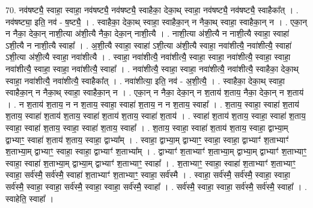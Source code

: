 \documentclass[17pt]{extarticle}
\begin{document}
70. नव॑षष्ट्यै॒ स्वाहा॒ स्वाहा॒ नव॑षष्ट्यै॒ नव॑षष्ट्यै॒ स्वाहैका॒ देका॒थ् स्वाहा॒ नव॑षष्ट्यै॒ नव॑षष्ट्यै॒ स्वाहैका᳚त् । . नव॑षष्ट्या॒ इति॒ नव॑ - ष॒ष्ट्यै॒ । . स्वाहैका॒ देका॒थ् स्वाहा॒ स्वाहैका॒न् न नैका॒थ् स्वाहा॒ स्वाहैका॒न् न । . एका॒न् न नैका॒ देका॒न् नाशी॒त्या अ॑शी॒त्यै नैका॒ देका॒न् नाशी॒त्यै । . नाशी॒त्या अ॑शी॒त्यै न नाशी॒त्यै स्वाहा॒ स्वाहा॑ ऽशी॒त्यै न नाशी॒त्यै स्वाहा᳚ । . अ॒शी॒त्यै स्वाहा॒ स्वाहा॑ ऽशी॒त्या अ॑शी॒त्यै स्वाहा॒ नवा॑शीत्यै॒ नवा॑शीत्यै॒ स्वाहा॑ ऽशी॒त्या अ॑शी॒त्यै स्वाहा॒ नवा॑शीत्यै । . स्वाहा॒ नवा॑शीत्यै॒ नवा॑शीत्यै॒ स्वाहा॒ स्वाहा॒ नवा॑शीत्यै॒ स्वाहा॒ स्वाहा॒ नवा॑शीत्यै॒ स्वाहा॒ स्वाहा॒ नवा॑शीत्यै॒ स्वाहा᳚ । . नवा॑शीत्यै॒ स्वाहा॒ स्वाहा॒ नवा॑शीत्यै॒ नवा॑शीत्यै॒ स्वाहैका॒ देका॒थ् स्वाहा॒ नवा॑शीत्यै॒ नवा॑शीत्यै॒ स्वाहैका᳚त् । . नवा॑शीत्या॒ इति॒ नव॑ - अ॒शी॒त्यै॒ । . स्वाहैका॒ देका॒थ् स्वाहा॒ स्वाहैका॒न् न नैका॒थ् स्वाहा॒ स्वाहैका॒न् न । . एका॒न् न नैका॒ देका॒न् न श॒ताय॑ श॒ताय॒ नैका॒ देका॒न् न श॒ताय॑ । . न श॒ताय॑ श॒ताय॒ न न श॒ताय॒ स्वाहा॒ स्वाहा॑ श॒ताय॒ न न श॒ताय॒ स्वाहा᳚ । . श॒ताय॒ स्वाहा॒ स्वाहा॑ श॒ताय॑ श॒ताय॒ स्वाहा॑ श॒ताय॑ श॒ताय॒ स्वाहा॑ श॒ताय॑ श॒ताय॒ स्वाहा॑ श॒ताय॑ । . स्वाहा॑ श॒ताय॑ श॒ताय॒ स्वाहा॒ स्वाहा॑ श॒ताय॒ स्वाहा॒ स्वाहा॑ श॒ताय॒ स्वाहा॒ स्वाहा॑ श॒ताय॒ स्वाहा᳚ । . श॒ताय॒ स्वाहा॒ स्वाहा॑ श॒ताय॑ श॒ताय॒ स्वाहा॒ द्वाभ्या॒म् द्वाभ्याꣳ॒॒ स्वाहा॑ श॒ताय॑ श॒ताय॒ स्वाहा॒ द्वाभ्या᳚म् । . स्वाहा॒ द्वाभ्या॒म् द्वाभ्याꣳ॒॒ स्वाहा॒ स्वाहा॒ द्वाभ्याꣳ॑ श॒ताभ्याꣳ॑ श॒ताभ्या॒म् द्वाभ्याꣳ॒॒ स्वाहा॒ स्वाहा॒ द्वाभ्याꣳ॑ श॒ताभ्या᳚म् । . द्वाभ्याꣳ॑ श॒ताभ्याꣳ॑ श॒ताभ्या॒म् द्वाभ्या॒म् द्वाभ्याꣳ॑ श॒ताभ्याꣳ॒॒ स्वाहा॒ स्वाहा॑ श॒ताभ्या॒म् द्वाभ्या॒म् द्वाभ्याꣳ॑ श॒ताभ्याꣳ॒॒ स्वाहा᳚ । . श॒ताभ्याꣳ॒॒ स्वाहा॒ स्वाहा॑ श॒ताभ्याꣳ॑ श॒ताभ्याꣳ॒॒ स्वाहा॒ सर्व॑स्मै॒ सर्व॑स्मै॒ स्वाहा॑ श॒ताभ्याꣳ॑ श॒ताभ्याꣳ॒॒ स्वाहा॒ सर्व॑स्मै । . स्वाहा॒ सर्व॑स्मै॒ सर्व॑स्मै॒ स्वाहा॒ स्वाहा॒ सर्व॑स्मै॒ स्वाहा॒ स्वाहा॒ सर्व॑स्मै॒ स्वाहा॒ स्वाहा॒ सर्व॑स्मै॒ स्वाहा᳚ । . सर्व॑स्मै॒ स्वाहा॒ स्वाहा॒ सर्व॑स्मै॒ सर्व॑स्मै॒ स्वाहा᳚ । . स्वाहेति॒ स्वाहा᳚ । \newline
\pagebreak
{}
\end{document}
